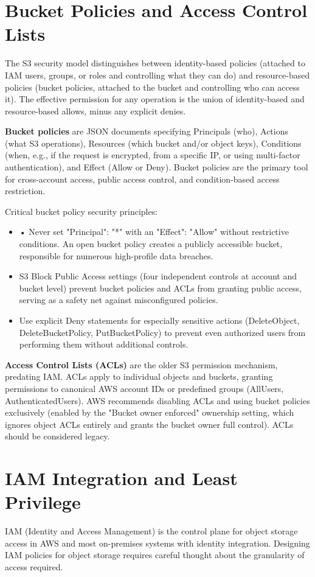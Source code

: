 \section{Bucket Policies and Access Control Lists}
The S3 security model distinguishes between identity-based policies (attached to IAM users, groups, or roles and controlling what they can do) and resource-based policies (bucket policies, attached to the bucket and controlling who can access it). The effective permission for any operation is the union of identity-based and resource-based allows, minus any explicit denies.

\textbf{Bucket policies} are JSON documents specifying Principals (who), Actions (what S3 operations), Resources (which bucket and/or object keys), Conditions (when, e.g., if the request is encrypted, from a specific IP, or using multi-factor authentication), and Effect (Allow or Deny). Bucket policies are the primary tool for cross-account access, public access control, and condition-based access restriction.

Critical bucket policy security principles:

\begin{itemize}
  \item • Never set "Principal": "*" with an "Effect": "Allow" without restrictive conditions. An open bucket policy creates a publicly accessible bucket, responsible for numerous high-profile data breaches.
  \item S3 Block Public Access settings (four independent controls at account and bucket level) prevent bucket policies and ACLs from granting public access, serving as a safety net against misconfigured policies.
  \item Use explicit Deny statements for especially sensitive actions (DeleteObject, DeleteBucketPolicy, PutBucketPolicy) to prevent even authorized users from performing them without additional controls.
\end{itemize}

\textbf{Access Control Lists (ACLs)} are the older S3 permission mechanism, predating IAM. ACLs apply to individual objects and buckets, granting permissions to canonical AWS account IDs or predefined groups (AllUsers, AuthenticatedUsers). AWS recommends disabling ACLs and using bucket policies exclusively (enabled by the "Bucket owner enforced" ownership setting, which ignores object ACLs entirely and grants the bucket owner full control). ACLs should be considered legacy.

\section{IAM Integration and Least Privilege}
IAM (Identity and Access Management) is the control plane for object storage access in AWS and most on-premises systems with identity integration. Designing IAM policies for object storage requires careful thought about the granularity of access required.

